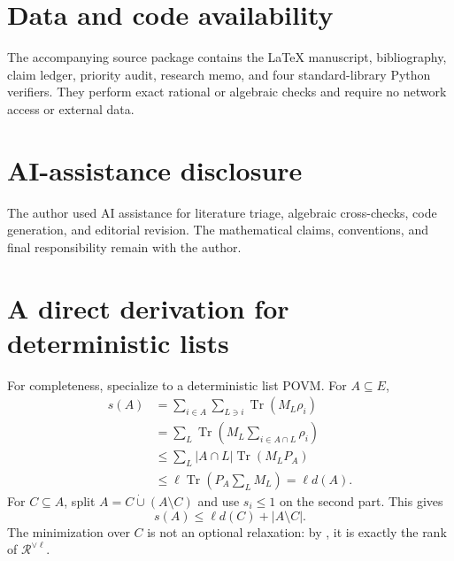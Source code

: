 \documentclass[11pt]{article}
\theoremstyle{definition}
\theoremstyle{remark}
\newcommand{\cR}{\mathcal R}
\newcommand{\Tr}{\operatorname{Tr}}
\begin{document}
\section*{Data and code availability}

The accompanying source package contains the \LaTeX{} manuscript, bibliography,
claim ledger, priority audit, research memo, and four standard-library Python
verifiers.  They perform exact rational or algebraic checks and require no
network access or external data.

\section*{AI-assistance disclosure}

The author used AI assistance for literature triage, algebraic cross-checks,
code generation, and editorial revision.  The mathematical claims,
conventions, and final responsibility remain with the author.




\appendix
\section{A direct derivation for deterministic lists}

For completeness, specialize  to a deterministic list POVM.
For $A\subseteq E$,
\begin{align*}
 s(A)
 &=\sum_{i\in A}\sum_{L\ni i}\Tr(M_L\rho_i)\\
 &=\sum_L\Tr\!\left(M_L\sum_{i\in A\cap L}\rho_i\right)\\
 &\leq\sum_L |A\cap L|\Tr(M_LP_A)\\
 &\leq\ell\Tr\!\left(P_A\sum_LM_L\right)
 =\ell d(A).
\end{align*}
For $C\subseteq A$, split $A=C\mathbin{\dot\cup}(A\setminus C)$ and use
$s_i\leq1$ on the second part.  This gives
\[
 s(A)\leq\ell d(C)+|A\setminus C|.
\]
The minimization over $C$ is not an optional relaxation: by
, it is exactly the rank of $\cR^{\vee\ell}$.
\end{document}
